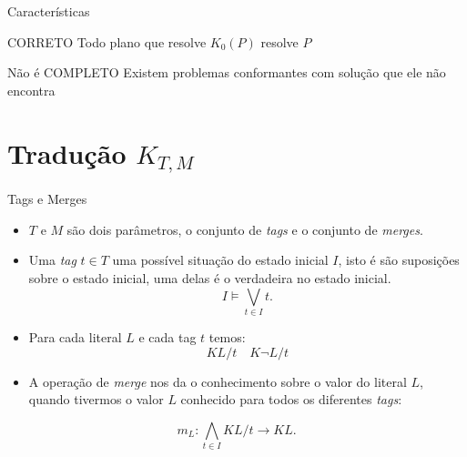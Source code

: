 \begin{frame}{Características}
    \begin{block}{CORRETO}
        Todo plano que resolve $K_0(P)$ resolve $P$
    \end{block}
    \begin{block}{\alert{Não é COMPLETO}}
        Existem problemas conformantes com solução que ele não encontra
    \end{block}
    
    
\end{frame}

\section{Tradução $K_{T,M}$}

\begin{frame}{Tags e Merges}
     \begin{itemize}
    \item $T$ e $M$ são dois parâmetros, o conjunto de \textit{tags} e o conjunto de \textit{merges}. 
    \item Uma \textit{tag} $t \in T$ uma possível situação do estado inicial $I$, isto é
        são suposições sobre o estado inicial, uma delas é o verdadeira no estado inicial.
        \[
            I \models \bigvee_{t \in I  } t.
        \]
    
    \item Para cada literal $L$ e cada tag $t$ temos:
    \[KL/t \quad K \lnot L/t\]
    
    \item A operação de \textit{merge} nos da o conhecimento sobre o valor do 
        literal $L$, quando tivermos o valor $L$ conhecido para todos os diferentes 
        \textit{tags}:
    \end{itemize}
        \[
            m_{L} : \bigwedge_{t \in I} KL/t \rightarrow KL.
        \]
\end{frame}

